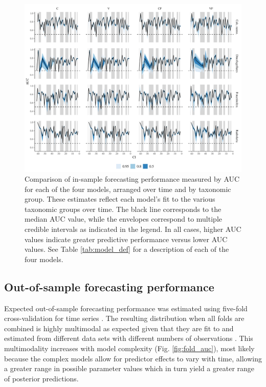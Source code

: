\documentclass[12pt,letterpaper]{article}
\begin{document}
\begin{refsection}
\begin{figure}[ht]
 \centering
 \includegraphics[width=\textwidth,height=0.5\textheight,keepaspectratio=true]{../results/figure/auc_taxon_time_full}
 \caption{Comparison of in-sample forecasting performance measured by AUC for each of the four models, arranged over time and by taxonomic group. These estimates reflect each model's fit to the various taxonomic groups over time. The black line corresponds to the median AUC value, while the envelopes correspond to multiple credible intervals as indicated in the legend. In all cases, higher AUC values indicate greater predictive performance versus lower AUC values. See Table \ref{tab:model_def} for a description of each of the four models.}
 \label{fig:auc_taxon_time}
\end{figure}




\subsection{Out-of-sample forecasting performance}

Expected out-of-sample forecasting performance was estimated using five-fold cross-validation for time series \citep{Arlot2010,Bergmeir2016}. The resulting distribution when all folds are combined is highly multimodal as expected given that they are fit to and estimated from different data sets with different numbers of observations \citep{ESL}. This multimodality increases with model complexity (Fig. \ref{fig:fold_auc}), most likely because the complex models allow for predictor effects to vary with time, allowing a greater range in possible parameter values which in turn yield a greater range of posterior predictions.


\end{refsection}
\end{document}
